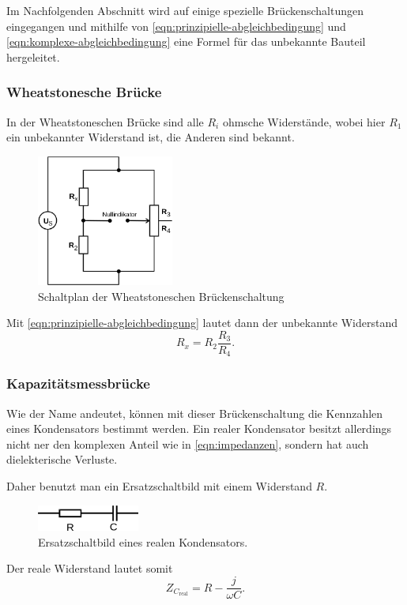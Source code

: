 Im Nachfolgenden Abschnitt wird auf einige spezielle Brückenschaltungen eingegangen und mithilfe von
\autoref{eqn:prinzipielle-abgleichbedingung} und \autoref{eqn:komplexe-abgleichbedingung} 
eine Formel für das unbekannte Bauteil hergeleitet.

\subsubsection{Wheatstonesche Brücke}
\label{sec:theorie-wheatstone}
In der Wheatstoneschen Brücke sind alle $R_i$ ohmsche Widerstände, wobei hier $R_1$ ein unbekannter
Widerstand ist, die Anderen sind bekannt.

\begin{figure}[H]
	\centering
	\includegraphics[width=0.4\textwidth]{bilder/wheatstone.png}
	\caption{Schaltplan der Wheatstoneschen Brückenschaltung}
	\label{fig:wheatstone-bruecke}
\end{figure}

Mit \autoref{eqn:prinzipielle-abgleichbedingung} lautet dann der unbekannte Widerstand
\begin{equation}
	R_x = R_2 \frac{R_3}{R_4}.
	\label{eqn:wheatstone-rx}
\end{equation}

\subsubsection{Kapazitätsmessbrücke}
\label{sec:theorie-kapazitaetsmessbruecke}

Wie der Name andeutet, können mit dieser Brückenschaltung die Kennzahlen eines Kondensators bestimmt werden.
Ein realer Kondensator besitzt allerdings nicht ner den komplexen Anteil wie in \autoref{eqn:impedanzen},
sondern hat auch dielekterische Verluste.

Daher benutzt man ein Ersatzschaltbild mit einem Widerstand $R$.
\begin{figure}[H]
	\centering
	\includegraphics[width=0.3\textwidth]{bilder/ersatz-kapazitaet.png}
	\caption{Ersatzschaltbild eines realen Kondensators.}
	\label{fig:ersatz-kondensator}
\end{figure}
Der reale Widerstand lautet somit
\begin{equation}
	Z_{C_\text{real}} = R - \frac{j}{\omega C}.
	\label{eqn:realer-wderstand-kondensator}
\end{equation}

